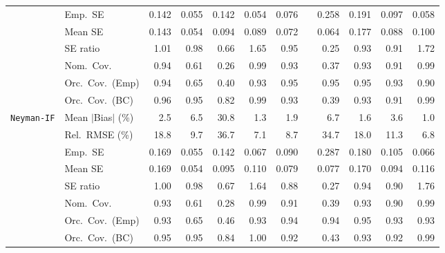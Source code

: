 \begin{landscape}
\begin{longtable}{llrrrrrrrrrr}
 & Emp.\ SE & 0.142 & 0.055 & 0.142 & 0.054 & 0.076 &  & 0.258 & 0.191 & 0.097 & 0.058 \\
 & Mean SE & 0.143 & 0.054 & 0.094 & 0.089 & 0.072 &  & 0.064 & 0.177 & 0.088 & 0.100 \\
 & SE ratio & \cellcolor{rankone}1.01 & \cellcolor{ranktwo}0.98 & 0.66 & 1.65 & \cellcolor{rankthree}0.95 &  & 0.25 & 0.93 & 0.91 & 1.72 \\
 & Nom.\ Cov. & \cellcolor{rankone}0.94 & 0.61 & 0.26 & \cellcolor{rankthree}0.99 & \cellcolor{ranktwo}0.93 &  & 0.37 & \cellcolor{ranktwo}0.93 & \cellcolor{rankthree}0.91 & \cellcolor{rankthree}0.99 \\
 & Orc.\ Cov.\ (Emp) & \cellcolor{ranktwo}0.94 & 0.65 & 0.40 & \cellcolor{rankthree}0.93 & \cellcolor{rankone}0.95 &  & \cellcolor{rankone}0.95 & \cellcolor{rankone}0.95 & \cellcolor{rankthree}0.93 & 0.90 \\
 & Orc.\ Cov.\ (BC) & \cellcolor{ranktwo}0.96 & \cellcolor{rankone}0.95 & 0.82 & 0.99 & \cellcolor{rankthree}0.93 &  & 0.39 & \cellcolor{rankthree}0.93 & 0.91 & 0.99 \\
\addlinespace[2pt]
\quad \texttt{Neyman-IF} & Mean $|$Bias$|$ (\%) & 2.5 & 6.5 & 30.8 & \cellcolor{ranktwo}1.3 & 1.9 &  & 6.7 & \cellcolor{rankthree}1.6 & 3.6 & \cellcolor{rankone}1.0 \\
 & Rel.\ RMSE (\%) & 18.8 & 9.7 & 36.7 & \cellcolor{ranktwo}7.1 & \cellcolor{rankthree}8.7 &  & 34.7 & 18.0 & 11.3 & \cellcolor{rankone}6.8 \\
 & Emp.\ SE & 0.169 & 0.055 & 0.142 & 0.067 & 0.090 &  & 0.287 & 0.180 & 0.105 & 0.066 \\
 & Mean SE & 0.169 & 0.054 & 0.095 & 0.110 & 0.079 &  & 0.077 & 0.170 & 0.094 & 0.116 \\
 & SE ratio & \cellcolor{rankone}1.00 & \cellcolor{ranktwo}0.98 & 0.67 & 1.64 & 0.88 &  & 0.27 & \cellcolor{rankthree}0.94 & 0.90 & 1.76 \\
 & Nom.\ Cov. & \cellcolor{rankone}0.93 & 0.61 & 0.28 & \cellcolor{ranktwo}0.99 & \cellcolor{ranktwo}0.91 &  & 0.39 & \cellcolor{rankone}0.93 & \cellcolor{rankthree}0.90 & \cellcolor{ranktwo}0.99 \\
 & Orc.\ Cov.\ (Emp) & \cellcolor{rankthree}0.93 & 0.65 & 0.46 & \cellcolor{rankthree}0.93 & \cellcolor{ranktwo}0.94 &  & \cellcolor{ranktwo}0.94 & \cellcolor{rankone}0.95 & \cellcolor{rankthree}0.93 & \cellcolor{rankthree}0.93 \\
 & Orc.\ Cov.\ (BC) & \cellcolor{rankone}0.95 & \cellcolor{rankone}0.95 & 0.84 & 1.00 & \cellcolor{rankthree}0.92 &  & 0.43 & \cellcolor{ranktwo}0.93 & \cellcolor{rankthree}0.92 & 0.99 \\

\end{longtable}
\end{landscape}
